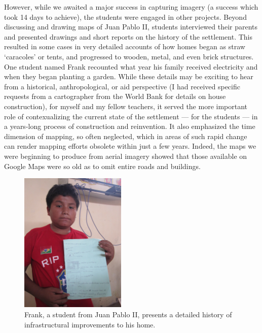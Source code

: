 \documentclass[11pt,oneside,notitlepage]{report}
\begin{document}
{{However, while we awaited a major success in capturing imagery (a success which took 14 days to achieve), the students were engaged in other projects. Beyond discussing and drawing maps of Juan Pablo II, students interviewed their parents and presented drawings and short reports on the history of the settlement. This resulted in some cases in very detailed accounts of how homes began as straw `caracoles' or tents, and progressed to wooden, metal, and even brick structures. One student named Frank recounted what year his family received electricity and when they began planting a garden. While these details may be exciting to hear from a historical, anthropological, or aid perspective (I had received specific requests from a cartographer from the World Bank for details on house construction), for myself and my fellow teachers, it served the more important role of contexualizing the current state of the settlement --- for the students --- in a years-long process of construction and reinvention. It also emphasized the time dimension of mapping, so often neglected, which in areas of such rapid change can render mapping efforts obsolete within just a few years. Indeed, the maps we were beginning to produce from aerial imagery showed that those available on Google Maps were so old as to omit entire roads and buildings.

\begin{figure}
	\begin{flushright}
		\includegraphics[width=0.45\textwidth]{images/juan-pablo-frank.jpg}
		\caption{Frank, a student from Juan Pablo II, presents a detailed history of infrastructural improvements to his home.}
	\end{flushright}
\end{figure}

}}
\end{document}

